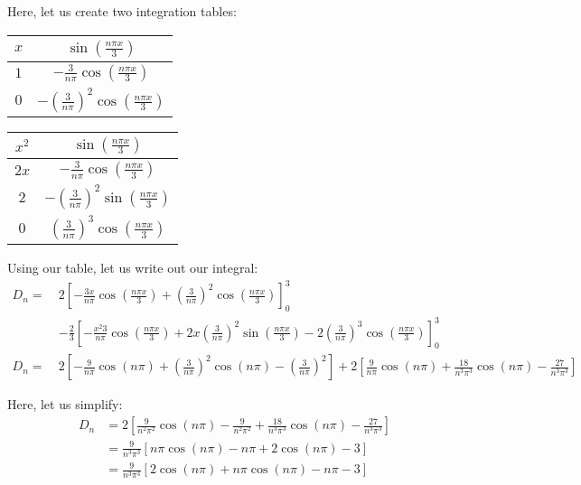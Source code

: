 \documentclass{article}
\begin{document}
\begin{enumerate}
\begin{enumerate}
     Here, let us create two integration tables:
     \begin{center}
       \begin{tabular}{c|c}
         $x$ & $\sin\left(\frac{n \pi x}{3}\right)$\\
         \hline
         $1$ & $-\frac{3}{n \pi} \cos\left(\frac{n \pi x}{3}\right)$\\
         \hline
         $0$ & $-\left(\frac{3}{n \pi}\right)^2 \cos\left(\frac{n \pi x}{3}\right)$
       \end{tabular}
       \begin{tabular}{c|c}
         $x^2$ & $\sin\left(\frac{n \pi x}{3}\right)$\\
         \hline
         $2x$ &  $-\frac{3}{n \pi} \cos\left(\frac{n \pi x}{3}\right)$\\
         \hline
         $2$ &   $-\left(\frac{3}{n \pi}\right)^2 \sin\left(\frac{n \pi x}{3}\right)$\\
         \hline
         $0$ &   $\left(\frac{3}{n \pi}\right)^3 \cos\left(\frac{n \pi x}{3}\right)$
       \end{tabular}
     \end{center}

     Using our table, let us write out our integral:
     \begin{align}
       D_n =\ &
       2
      \left[
       -\frac{3 x}{n \pi} \cos\left(\frac{n \pi x}{3}\right) +
       \left(\frac{3}{n \pi}\right)^2 \cos\left(\frac{n \pi x}{3}\right)
      \right]^3_0 \\ & -
      \frac{2}{3}
      \left[
      - \frac{x^2 3}{n \pi} \cos\left( \frac{n \pi x}{3} \right)
      + 2x \left(\frac{3}{n \pi}\right)^2 \sin\left( \frac{n \pi x}{3} \right)
      - 2 \left(\frac{3}{n \pi}\right)^3  \cos\left( \frac{n \pi x}{3} \right)
      \right]^3_0\\
      D_n =\ &
      2
     \left[
      -\frac{9}{n \pi} \cos\left(n \pi\right) +
      \left(\frac{3}{n \pi}\right)^2 \cos\left(n \pi \right)
      - \left(\frac{3}{n \pi}\right)^2
     \right] +
     2
     \left[
     \frac{9}{n \pi} \cos\left( n \pi \right)
     + \frac{18}{n^3 \pi^3}  \cos\left( n \pi \right)
     - \frac{27}{n^3\pi^3}
     \right]
     \end{align}

     Here, let us simplify:
     \begin{align}
       D_n & = 2\left[
       \frac{9}{n^2 \pi^2} \cos(n \pi) - \frac{9}{n^2 \pi^2} + \frac{18}{n^3 \pi^3} \cos(n \pi) - \frac{27}{n^3 \pi^3}
       \right]\\
       & = \frac{9}{n^3 \pi^3}
       \left[
       n \pi \cos(n \pi) - n \pi + 2 \cos(n \pi) - 3
       \right]\\
       & = \frac{9}{n^3 \pi^3}
       \left[
       2 \cos(n \pi) + n \pi \cos(n \pi) - n \pi - 3
       \right]
     \end{align}


\end{enumerate}
\end{enumerate}
\end{document}
